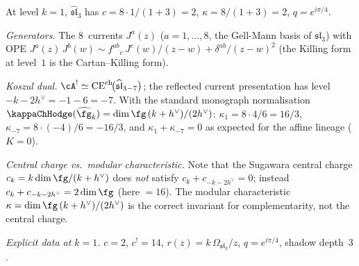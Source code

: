 \begin{computation}[Affine $\widehat{\mathfrak{sl}}_3$ at $k=1$:
explicit holographic quantisation; \ClaimStatusProvedHere]
\label{comp:sl3-k1-holographic}
At level $k=1$, $\widehat{\mathfrak{sl}}_3$ has
$c=8\cdot 1/(1+3)=2$,
$\kappa=8/(1+3)=2$,
$q=e^{i\pi/4}$.

\emph{Generators.}
The $8$~currents $J^a(z)$ ($a=1,\dots,8$, the Gell-Mann
basis of $\mathfrak{sl}_3$) with OPE
$J^a(z)\,J^b(w)\sim
f^{ab}{}_c\,J^c(w)/(z-w)
+\delta^{ab}/(z-w)^2$
(the Killing form at level~$1$ is the Cartan--Killing form).

\emph{Koszul dual.}
$\cA^!\simeq
\CE^{\mathrm{ch}}\!\bigl(\widehat{\mathfrak{sl}}_3{}_{-7}\bigr)$;
the reflected current presentation has level $-k-2h^\vee=-1-6=-7$.
With the standard monograph normalisation
$\kappaChHodge(\widehat{\fg}_k) = \dim\fg\,(k+h^\vee)/(2h^\vee)$:
$\kappa_1 = 8\cdot 4/6 = 16/3$,
$\kappa_{-7} = 8\cdot(-4)/6 = -16/3$,
and $\kappa_1+\kappa_{-7}=0$ as expected for the affine lineage
($K=0$).

\emph{Central charge vs.\ modular characteristic.}
Note that the Sugawara central charge $c_k = k\dim\fg/(k+h^\vee)$
does \emph{not} satisfy $c_k + c_{-k-2h^\vee} = 0$; instead
$c_k + c_{-k-2h^\vee} = 2\dim\fg$ (here $= 16$). The modular
characteristic $\kappa = \dim\fg\,(k+h^\vee)/(2h^\vee)$ is the
correct invariant for complementarity, not the central charge.

\emph{Explicit data at $k=1$.}
$c=2$, $c^!=14$,
$r(z)=k\,\Omega_{\mathfrak{sl}_3}/z$,
$q=e^{i\pi/4}$, shadow depth~$3$.
\end{computation}

